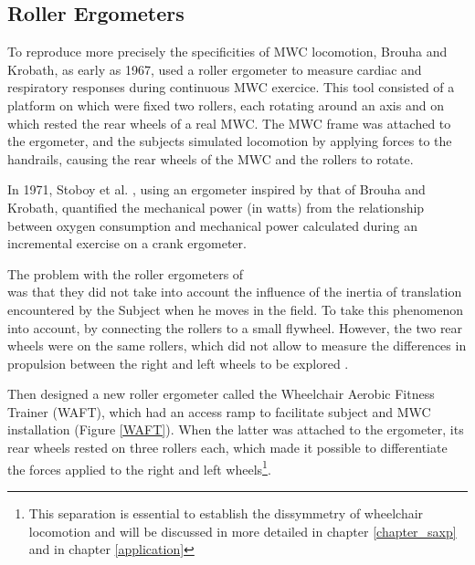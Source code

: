 \subsection{Roller Ergometers}
To reproduce more precisely the specificities of  MWC locomotion, Brouha and Krobath\cite{brouha1967continuous}, as early as 1967, used a roller ergometer to measure cardiac and respiratory responses during continuous MWC exercice. This tool consisted of a platform on which were fixed two rollers, each rotating around an axis and on which rested the rear wheels of a real MWC. The MWC frame was attached to the ergometer, and the subjects simulated locomotion by applying forces to the handrails, causing the rear wheels of the MWC and the rollers to rotate. 


In 1971, Stoboy et al. \cite{stoboy1971workload}, using an ergometer inspired by that of Brouha and Krobath, quantified the mechanical power (in watts) from the relationship between oxygen consumption and mechanical power calculated during an incremental exercise on a crank ergometer.


The problem with the roller ergometers of \cite{brouha1967continuous}\\\cite{stoboy1971workload} was that they did not take into account the influence of the inertia of translation encountered by the Subject when he moves in the field. To take this phenomenon into account, by connecting the rollers to a small flywheel. However, the two rear wheels were on the same rollers, which did not allow to measure the differences in propulsion between the right and left wheels to be explored \cite{brouha1967continuous} \cite{stoboy1971workload}.



Then \cite{langbein1993research} \cite{langbein1993calibration} \cite{langbein1994initial}  designed a new roller ergometer called the Wheelchair Aerobic Fitness Trainer (WAFT), which had an access ramp to facilitate subject and MWC installation (Figure \ref{WAFT}). When the latter was attached to the ergometer, its rear wheels rested on three rollers each, which made it possible to differentiate the forces applied to the right and left wheels\footnote{This separation is essential to establish the dissymmetry of wheelchair locomotion and will be discussed in more detailed in chapter \ref{chapter_saxp} and in chapter \ref{application}}.

